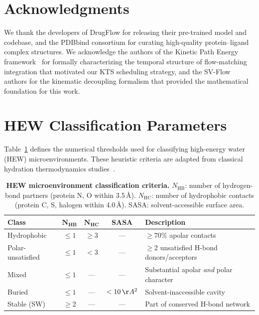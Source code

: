 \documentclass{article}
\begin{document}
\section*{Acknowledgments}

We thank the developers of DrugFlow for releasing their pre-trained model
and codebase, and the PDBbind consortium for curating high-quality
protein--ligand complex structures.  We acknowledge the authors of the
Kinetic Path Energy framework~\cite{li2026kpe} for formally characterizing
the temporal structure of flow-matching integration that motivated our KTS
scheduling strategy, and the SV-Flow authors for the kinematic decoupling
formalism that provided the mathematical foundation for this work.

\appendix

\section{HEW Classification Parameters}
\label{app:hew_params}

Table~\ref{tab:hew_classification} defines the numerical thresholds used for
classifying high-energy water (HEW) microenvironments.  These heuristic
criteria are adapted from classical hydration thermodynamics
studies~\cite{abel2008,michel2009}.

\begin{table}[H]
  \centering
  \caption{\textbf{HEW microenvironment classification criteria.}
    $N_{\text{HB}}$: number of hydrogen-bond partners (protein N, O within
    3.5\,\AA).  $N_{\text{HC}}$: number of hydrophobic contacts (protein C, S,
    halogen within 4.0\,\AA).  SASA: solvent-accessible surface area.}
  \label{tab:hew_classification}
  \small
  \begin{tabular}{l c c c l}
    \toprule
    \textbf{Class} & $\bm{N_{\text{HB}}}$ & $\bm{N_{\text{HC}}}$ & \textbf{SASA} & \textbf{Description} \\
    \midrule
    Hydrophobic       & $\le 1$ & $\ge 3$           & ---           & $\ge 70\%$ apolar contacts \\
    Polar-unsatisfied & $\le 1$ & $< 3$             & ---           & $\ge 2$ unsatisfied H-bond donors/acceptors \\
    Mixed             & $\le 1$ & ---               & ---           & Substantial apolar \emph{and} polar character \\
    Buried            & $\le 1$ & ---               & $< 10\,\AA^2$ & Solvent-inaccessible cavity \\
    Stable (SW)       & $\ge 2$ & ---               & ---           & Part of conserved H-bond network \\
    \bottomrule
  \end{tabular}
\end{table}
\end{document}
